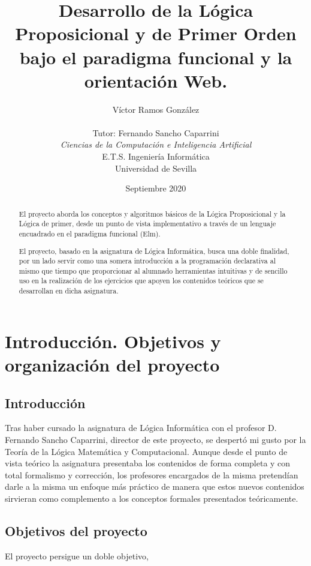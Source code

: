\documentclass[a4paper]{report}
\title{Desarrollo de la Lógica Proposicional y de Primer Orden bajo el paradigma funcional y la orientación Web.}
\author{Víctor Ramos González\\\\
   Tutor: Fernando Sancho Caparrini\\
   \textit{Ciencias de la Computación e Inteligencia Artificial}\\
   E.T.S. Ingeniería Informática\\
   Universidad de Sevilla\\
  \vspace{8cm}
  \date{Septiembre 2020}
}
\def\blankpage{%
      \clearpage%
      \thispagestyle{empty}%
      \addtocounter{page}{0}%
      \null%
      \clearpage}
\begin{document}
\dominitoc




\blankpage

\maketitle

\begin{abstract}

El proyecto aborda los conceptos y algoritmos básicos de la Lógica Proposicional y la Lógica de primer, desde un punto de vista implementativo a través de un lenguaje encuadrado en el paradigma funcional (Elm).

El proyecto, basado en la asignatura de Lógica Informática, busca una doble finalidad, por un lado servir como una somera introducción a la programación declarativa al mismo que tiempo que proporcionar al alumnado  herramientas intuitivas y de sencillo uso en la realización de los ejercicios que apoyen los contenidos teóricos que se desarrollan en dicha asignatura.
\end{abstract}

\tableofcontents

\newpage


\chapter{Introducción. Objetivos y organización del proyecto}
\renewcommand{\mtctitle}{}
\mtcskip
\minitoc
\newpage

\section{Introducción}

Tras haber cursado la asignatura de Lógica Informática con el profesor D. Fernando Sancho Caparrini, director de este proyecto, se despertó mi gusto por la Teoría de la Lógica Matemática y Computacional. Aunque desde el punto de vista teórico la asignatura presentaba los contenidos de forma completa y con total formalismo y corrección, los profesores encargados de la misma pretendían darle a la misma un enfoque más práctico de manera que estos nuevos contenidos sirvieran como complemento a los conceptos formales presentados teóricamente.


\section{Objetivos del proyecto}
El proyecto persigue un doble objetivo,
\end{document}
